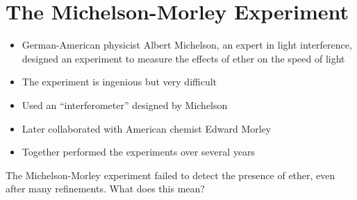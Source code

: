 \section{The Michelson-Morley Experiment}
\begin{itemize}
\item German-American physicist Albert Michelson, an expert in light
  interference, designed an experiment to measure the effects of ether on the
  speed of light
\item The experiment is ingenious but very difficult
\item Used an ``interferometer'' designed by Michelson
\item Later collaborated with American chemist Edward Morley
\item Together performed the experiments over several years
\end{itemize}
%
%
%
%
%
%
%
%  
%
%  
%
%
%
%
The Michelson-Morley experiment failed to detect the presence of ether, even
after many refinements. What does this mean?
